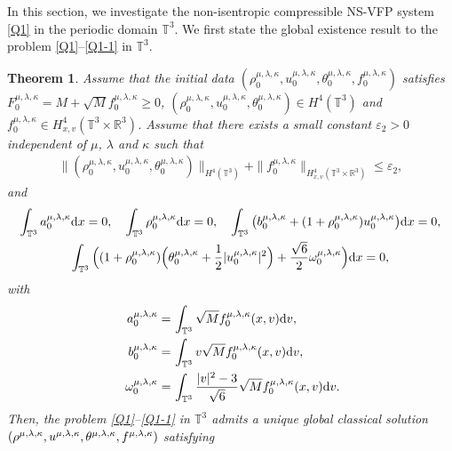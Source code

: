 \documentclass[reqno,11pt]{amsart}
\theoremstyle{plain}
\newtheorem{thm}{Theorem}[section]
\numberwithin{equation}{section}
\newcommand{\eps}{{\varepsilon}}
\begin{document}
In this section, we investigate the non-isentropic compressible 
 NS-VFP system \eqref{Q1}   in the periodic domain $\mathbb{T}^3$. 
We first state the global existence result to the   problem 
\eqref{Q1}--\eqref{Q1-1} in $\mathbb{T}^3$. 
\begin{thm}\label{T1.5}
Assume that the initial data $(\rho_0^{\mu,\lambda,\kappa},
u_0^{\mu,\lambda,\kappa},\theta_0^{\mu,\lambda,\kappa},f_0^{\mu,\lambda,\kappa})$
satisfies $F_0^{\mu,\lambda,\kappa}=M+\sqrt{M}f_0^{\mu,\lambda,\kappa}\geq 0$, 
$(\rho_0^{\mu,\lambda,\kappa},u_0^{\mu,\lambda,\kappa},\theta_0^{\mu,\lambda,\kappa})
\in H^4(\mathbb{T}^3)$ and $f_0^{\mu,\lambda,\kappa}\in H^4_{x,v}(\mathbb{T}^3\times\mathbb{R}^3)$.
Assume that there exists a  small constant $\eps_2>0$ independent of $\mu$, $\lambda$ and $\kappa$  such that
\begin{align*}
\|(\rho^{{\mu,\lambda,\kappa}}_0,u^{{\mu,\lambda,\kappa}}_0,
\theta^{{\mu,\lambda,\kappa}}_0)\|_{H^4(\mathbb{T}^3)}
+\|f^{\mu,\lambda,\kappa}_0\|_{H^4_{x,v}(\mathbb{T}^3\times\mathbb{R}^3)}\leq \eps_2,   
\end{align*}
 and
\begin{gather}
\int_{\mathbb{T}^{3}}a_{0}^{{\mu,\lambda,\kappa}}\mathrm{d}x=0,
\quad\int_{\mathbb{T}^3} 
 \rho_{0}^{{\mu,\lambda,\kappa}}\mathrm{d}x=0,
 \quad\int_{\mathbb{T}^3}\big(b_0^{\mu,\lambda,
 \kappa}+(1+\rho_0^{\mu,\lambda,\kappa})u_0^{\mu,\lambda,\kappa}\big){\rm d}x=0, \label{e1-1}\\
\int_{\mathbb{T}^{3}}\Big((1+\rho^{{\mu,\lambda,\kappa}}_{0})
\Big(\theta_0^{\mu,\lambda,\kappa}+\frac{1}{2}|u_0^{\mu,\lambda,\kappa}|^2\Big)
+\frac{\sqrt{6}}{2}\omega^{\mu,\lambda,\kappa}_0\Big)\mathrm{d}x=0,\label{e1-2}
\end{gather}
with
\begin{align*}
a_0^{\mu,\lambda,\kappa}=&\,\int_{\mathbb{T}^3}\sqrt{M}f_0^{\mu,\lambda,\kappa}(x,v){\rm d}v,\\
b_0^{\mu,\lambda,\kappa}=&\,\int_{\mathbb{T}^3}v\sqrt{M}f_0^{\mu,\lambda,\kappa}(x,v){\rm d}v,\\
\ \omega_0^{\mu,\lambda,\kappa}=
&\,\int_{\mathbb{T}^3}\frac{|v|^2-3}{\sqrt{6}}\sqrt{M}f_0^{\mu,\lambda,\kappa}(x,v){\rm d}v.
\end{align*}
Then, the  problem \eqref{Q1}--\eqref{Q1-1} in $\mathbb{T}^3$ admits a unique global
 classical solution $(\rho^{{\mu,\lambda,\kappa}}, u^{{\mu,\lambda,\kappa}},\theta^{{\mu,\lambda,\kappa}},
  \linebreak f^{{\mu,\lambda,\kappa}})$  satisfying 

\end{thm}
\end{document}
